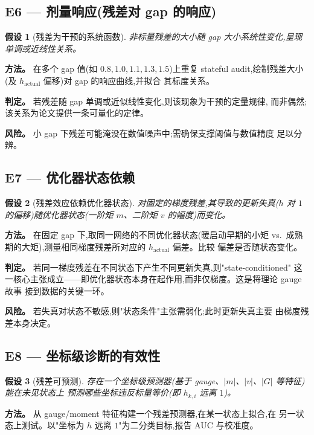 \documentclass[UTF8,11pt,a4paper]{ctexart}
\newtheorem{hypothesis}{假设}[section]
\begin{document}
\subsection{E6 --- 剂量响应(残差对 gap 的响应)}
\begin{hypothesis}[残差为干预的系统函数]
\label{hyp:E6}
非标量残差的大小随 gap 大小系统性变化,呈现单调或近线性关系。
\end{hypothesis}

\textbf{方法。} 在多个 gap 值(如 $0.8, 1.0, 1.1, 1.3, 1.5$)上重复 stateful
audit,绘制残差大小(及 $h_{\mathrm{actual}}$ 偏移)对 gap 的响应曲线,并拟合
其标度关系。

\textbf{判定。} 若残差随 gap 单调或近似线性变化,则该现象为干预的定量规律,
而非偶然;该关系为论文提供一条可量化的定律。

\textbf{风险。} 小 gap 下残差可能淹没在数值噪声中;需确保支撑阈值与数值精度
足以分辨。

\subsection{E7 --- 优化器状态依赖}
\begin{hypothesis}[残差效应依赖优化器状态]
\label{hyp:E7}
对固定的梯度残差,其导致的更新失真($h$ 对 $1$ 的偏移)随优化器状态(一阶矩
$m$、二阶矩 $v$ 的幅度)而变化。
\end{hypothesis}

\textbf{方法。} 在固定 gap 下,取同一网络的不同优化器状态(暖启动早期的小矩
vs.\ 成熟期的大矩),测量相同梯度残差所对应的 $h_{\mathrm{actual}}$ 偏差。比较
偏差是否随状态变化。

\textbf{判定。} 若同一梯度残差在不同状态下产生不同更新失真,则"state-conditioned"
这一核心主张成立——即优化器状态本身在起作用,而非仅梯度。这是将理论 gauge 故事
接到数据的关键一环。

\textbf{风险。} 若失真对状态不敏感,则"状态条件"主张需弱化;此时更新失真主要
由梯度残差本身决定。

\subsection{E8 --- 坐标级诊断的有效性}
\begin{hypothesis}[残差可预测]
\label{hyp:E8}
存在一个坐标级预测器(基于 gauge、$|m|$、$|v|$、$|G|$ 等特征)能在未见状态上
预测哪些坐标违反标量等价(即 $h_{k,i}$ 远离 $1$)。
\end{hypothesis}

\textbf{方法。} 从 gauge/moment 特征构建一个残差预测器,在某一状态上拟合,在
另一状态上测试。以"坐标为 $h$ 远离 $1$"为二分类目标,报告 AUC 与校准度。
\end{document}
